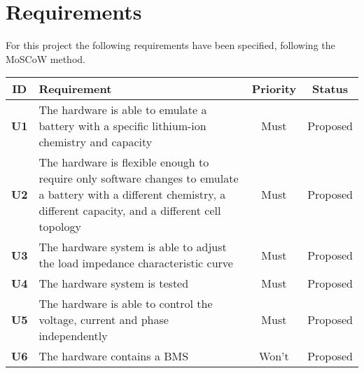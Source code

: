 \section{Requirements}
For this project the following requirements have been specified, following the MoSCoW method. 

\begin{longtable}{|c|p{10cm}|c|c|}
    \hline
    \textbf{ID} & \textbf{Requirement} & \textbf{Priority} & \textbf{Status}\\ \hline 
    \textbf{U1} & The hardware is able to emulate a battery with a specific lithium-ion chemistry and capacity & Must & Proposed\\ \hline
    \textbf{U2} & The hardware is flexible enough to require only software changes to emulate a battery with a different chemistry, a different capacity, and a different cell topology & Must & Proposed\\ \hline
    \textbf{U3} & The hardware system is able to adjust the load impedance characteristic curve & Must & Proposed\\ \hline
    \textbf{U4} & The hardware system is tested & Must & Proposed\\ \hline
    \textbf{U5} & The hardware is able to control the voltage, current and phase independently & Must & Proposed\\ \hline
    \textbf{U6} & The hardware contains a BMS & Won't & Proposed\\ \hline
\end{longtable}

